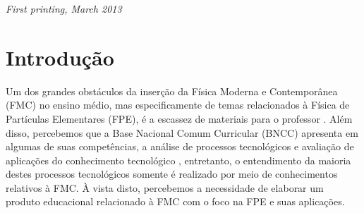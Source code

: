 \documentclass[12pt,fleqn]{book} %
\begin{document}
\noindent \textit{First printing, March 2013} %




\pagestyle{empty} %

\tableofcontents %

\cleardoublepage %

\pagestyle{fancy} %





\chapter{Introdução}
Um dos grandes obstáculos da inserção da Física Moderna e Contemporânea (FMC) no ensino médio, mas especificamente de temas relacionados à Física de Partículas Elementares (FPE), é a escassez de materiais para o professor \textcite{siqueira2005revisando}. Além disso, percebemos que a Base Nacional Comum Curricular (BNCC) apresenta em algumas de suas competências, a análise de processos tecnológicos e avaliação de aplicações do conhecimento tecnológico \textcite{medio2017brasilia}, entretanto, o entendimento da maioria destes processos tecnológicos somente é realizado por meio de conhecimentos relativos à FMC.
À vista disto, percebemos a necessidade de elaborar um produto educacional relacionado à FMC com o foco na FPE e suas aplicações.
\end{document}
